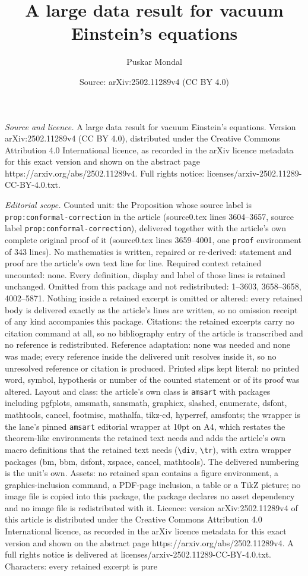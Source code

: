 \documentclass[10pt,a4paper]{amsart}
\title[A large data result for vacuum Einstein's equations]{A large data result for vacuum Einstein's equations}
\author{Puskar Mondal}
\date{Source: arXiv:2502.11289v4 (CC BY 4.0)}
\begin{document}
\maketitle

\noindent\emph{Source and licence.} A large data result for vacuum Einstein's equations. Version arXiv:2502.11289v4 (CC BY 4.0), distributed under the Creative Commons Attribution 4.0 International licence, as recorded in the arXiv licence metadata for this exact version and shown on the abstract page https://arxiv.org/abs/2502.11289v4. Full rights notice: licenses/arxiv-2502.11289-CC-BY-4.0.txt.\par\smallskip

\noindent\textit{Editorial scope.} Counted unit: the Proposition whose source label is \texttt{prop:conformal-correction} in the article (source0.tex lines 3604--3657, source label \texttt{prop:conformal-correction}), delivered together with the article's own complete original proof of it (source0.tex lines 3659--4001, one \texttt{proof} environment of 343 lines). No mathematics is written, repaired or re-derived: statement and proof are the article's own text line for line. Required context retained uncounted: none. Every definition, display and label of those lines is retained unchanged. Omitted from this package and not redistributed: 1--3603, 3658--3658, 4002--5871. Nothing inside a retained excerpt is omitted or altered: every retained body is delivered exactly as the article's lines are written, so no omission receipt of any kind accompanies this package. Citations: the retained excerpts carry no citation command at all, so no bibliography entry of the article is transcribed and no reference is redistributed. Reference adaptation: none was needed and none was made; every reference inside the delivered unit resolves inside it, so no unresolved reference or citation is produced. Printed slips kept literal: no printed word, symbol, hypothesis or number of the counted statement or of its proof was altered. Layout and class: the article's own class is \texttt{amsart} with packages including pgfplots, amsmath, sansmath, graphicx, slashed, enumerate, dsfont, mathtools, cancel, footmisc, mathalfa, tikz-cd, hyperref, amsfonts; the wrapper is the lane's pinned \texttt{amsart} editorial wrapper at 10pt on A4, which restates the theorem-like environments the retained text needs and adds the article's own macro definitions that the retained text needs (\texttt{\textbackslash div}, \texttt{\textbackslash tr}), with extra wrapper packages (bm, bbm, dsfont, xspace, cancel, mathtools). The delivered numbering is the unit's own. Assets: no retained span contains a figure environment, a graphics-inclusion command, a PDF-page inclusion, a table or a TikZ picture; no image file is copied into this package, the package declares no asset dependency and no image file is redistributed with it. Licence: version arXiv:2502.11289v4 of this article is distributed under the Creative Commons Attribution 4.0 International licence, as recorded in the arXiv licence metadata for this exact version and shown on the abstract page https://arxiv.org/abs/2502.11289v4. A full rights notice is delivered at licenses/arxiv-2502.11289-CC-BY-4.0.txt. Characters: every retained excerpt is pure 
\end{document}
